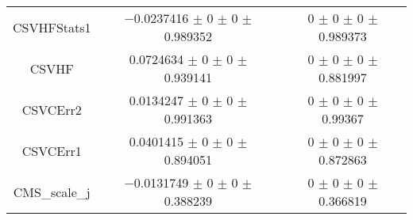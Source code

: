 \begin{table}
\begin{tabular}{ccc}
CSVHFStats1 	& \num{-0.0237416} $\pm$ \num{0} $\pm$ \num{0} $\pm$ \num{0.989352} 	& \num{0} $\pm$ \num{0} $\pm$ \num{0} $\pm$ \num{0.989373}\\
CSVHF 	& \num{0.0724634} $\pm$ \num{0} $\pm$ \num{0} $\pm$ \num{0.939141} 	& \num{0} $\pm$ \num{0} $\pm$ \num{0} $\pm$ \num{0.881997}\\
CSVCErr2 	& \num{0.0134247} $\pm$ \num{0} $\pm$ \num{0} $\pm$ \num{0.991363} 	& \num{0} $\pm$ \num{0} $\pm$ \num{0} $\pm$ \num{0.99367}\\
CSVCErr1 	& \num{0.0401415} $\pm$ \num{0} $\pm$ \num{0} $\pm$ \num{0.894051} 	& \num{0} $\pm$ \num{0} $\pm$ \num{0} $\pm$ \num{0.872863}\\
CMS\_scale\_j 	& \num{-0.0131749} $\pm$ \num{0} $\pm$ \num{0} $\pm$ \num{0.388239} 	& \num{0} $\pm$ \num{0} $\pm$ \num{0} $\pm$ \num{0.366819}\\
\bottomrule
\end{tabular}
\end{table}